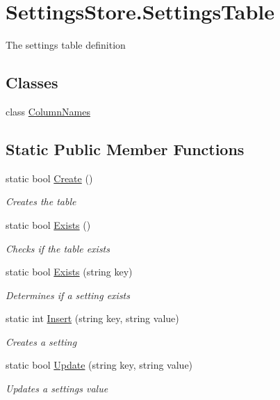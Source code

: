 \hypertarget{classOTA_1_1Data_1_1SettingsStore_1_1SettingsTable}{}\section{Settings\+Store.\+Settings\+Table}
\label{classOTA_1_1Data_1_1SettingsStore_1_1SettingsTable}


The settings table definition  


\subsection*{Classes}
\begin{DoxyCompactItemize}
\item 
class \hyperlink{classOTA_1_1Data_1_1SettingsStore_1_1SettingsTable_1_1ColumnNames}{Column\+Names}
\end{DoxyCompactItemize}
\subsection*{Static Public Member Functions}
\begin{DoxyCompactItemize}
\item 
static bool \hyperlink{classOTA_1_1Data_1_1SettingsStore_1_1SettingsTable_a52b70ad3b73f98d8c7d1c2fb064bd2dc}{Create} ()
\begin{DoxyCompactList}\small\item\em Creates the table \end{DoxyCompactList}\item 
static bool \hyperlink{classOTA_1_1Data_1_1SettingsStore_1_1SettingsTable_af9a16144d7f160f02759824d397b9916}{Exists} ()
\begin{DoxyCompactList}\small\item\em Checks if the table exists \end{DoxyCompactList}\item 
static bool \hyperlink{classOTA_1_1Data_1_1SettingsStore_1_1SettingsTable_aedef40f9105e8d73b5a036e4fcfcc020}{Exists} (string key)
\begin{DoxyCompactList}\small\item\em Determines if a setting exists \end{DoxyCompactList}\item 
static int \hyperlink{classOTA_1_1Data_1_1SettingsStore_1_1SettingsTable_ac09636b008364e03d9095053b76990d9}{Insert} (string key, string value)
\begin{DoxyCompactList}\small\item\em Creates a setting \end{DoxyCompactList}\item 
static bool \hyperlink{classOTA_1_1Data_1_1SettingsStore_1_1SettingsTable_a38fe5f9f700fe3c0ddb9165951c2e9f2}{Update} (string key, string value)
\begin{DoxyCompactList}\small\item\em Updates a settings value \end{DoxyCompactList}\end{DoxyCompactItemize}
